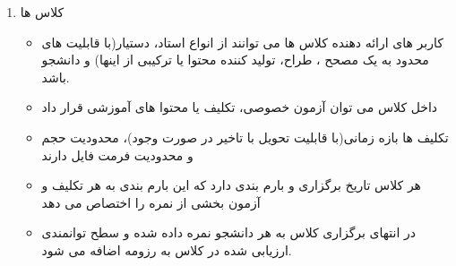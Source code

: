 \documentclass{article}
\begin{document}
\begin{enumerate}[\hspace{1cm}1.]
        \item کلاس ها
        \begin{itemize}
            \item کاربر های ارائه دهنده کلاس ها می توانند از انواع استاد، دستیار(با قابلیت های محدود به یک مصحح ، طراح، تولید کننده محتوا یا ترکیبی از اینها) و دانشجو باشد.
            \item داخل کلاس می توان آزمون خصوصی، تکلیف یا محتوا های آموزشی قرار داد
            \item تکلیف ها بازه زمانی(با قابلیت تحویل با تاخیر در صورت وجود)، محدودیت حجم و محدودیت فرمت فایل دارند
            \item هر کلاس تاریخ برگزاری و بارم بندی دارد که این بارم بندی به هر تکلیف و آزمون بخشی از نمره را اختصاص می دهد
            \item در انتهای برگزاری کلاس به هر دانشجو نمره داده شده و سطح توانمندی ارزیابی شده در کلاس به رزومه اضافه می شود.
        \end{itemize}
        
    \end{enumerate}
\end{document}
